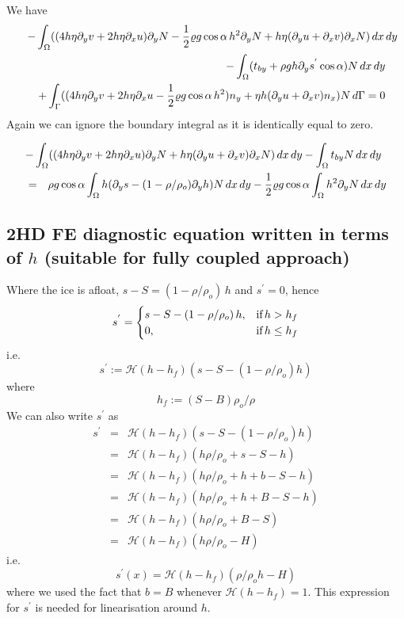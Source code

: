 \documentclass[10pt,a4paper]{book}
\newcommand{\He}{\mathcal{H}}
\newcommand{\p}{\partial}
\newcommand{\tby}{t_{by}}
\begin{document}
We have
\begin{eqnarray}
\lefteqn{-\int_{\Omega} ( (4 h \eta \p_y v + 2 h \eta \p_x u)\p_y N 
- \frac{1}{2} \varrho g \cos \alpha \,  h^2 \p_y N
+  h \eta (\p_y u + \p_x v) \p_x N) \, dx \, dy }\nonumber \\
& & - \int_{\Omega}( \tby + \rho g h \p_y s^{'} \cos \alpha ) N \, dx \, dy \nonumber \\
& & + \int_{\Gamma} ( (4 h \eta \p_y v + 2 h \eta \p_x u- \frac{1}{2} \varrho g  \cos \alpha \, h^2 ) n_y + \eta h(\p_y u + \p_x v) n_x ) N \, d\Gamma=0
\end{eqnarray}
Again we can ignore the boundary integral as it is identically equal to zero.



\begin{eqnarray}
\lefteqn{-\int_{\Omega} ( (4 h \eta \p_y v + 2 h \eta \p_x u)\p_y N 
+  h \eta (\p_y u + \p_x v) \p_x N) \, dx \, dy 
-\int_{\Omega} \tby N \, dx \, dy } \nonumber \\
&=& \rho g \cos \alpha \int_{\Omega} h (\p_y s-(1-\rho/\rho_o) \p_y h)  N \, dx \, dy 
- \frac{1}{2}  \varrho g \cos \alpha  \int_{\Omega} h^2 \p_y N\, dx \, dy
\end{eqnarray}



\subsection{2HD FE diagnostic equation written in terms of $h$ (suitable for fully coupled approach)}
Where the ice is afloat, $s-S=(1-\rho/\rho_o) \,h $ and $s^{'}=0$, hence
\[
s^{'}=\begin{cases} s-S-(1-\rho/\rho_o)\,h  , & \hbox{if} \, h>h_f \\  
                     0 ,                     & \hbox{if}\, h\le h_f  \end{cases}
\]
i.e.\
\[
s^{'} := \He(h-h_f)  (s-S-(1-\rho/\rho_o) h) 
\]
where
\[
h_f :=(S-B) \rho_o/\rho 
\]
We can also write $s^{'}$ as
\begin{eqnarray*}
s^{'} &=& \He(h-h_f) (s-S-(1-\rho/\rho_o) h ) \\
          &=& \He(h-h_f)  (h \rho/\rho_o +s-S-h) \\
          &=&  \He(h-h_f) (h \rho/\rho_o +h+b-S-h) \\
          &=&  \He(h-h_f) (h \rho/\rho_o +h+B-S-h) \\
          &=&  \He(h-h_f) (h \rho/\rho_o +B-S) \\
          &=&  \He(h-h_f) (h \rho/\rho_o -H) 
\end{eqnarray*}
i.e.\
\begin{equation}
 s^{'}(x) =\He(h-h_f) (\rho/\rho_o h - H) 
\label{eq:sdoth}
\end{equation}
where we used the fact that $b=B$ whenever  $\He(h-h_f)=1$. This expression for $s^{'}$ is needed for linearisation around $h$.
\end{document}
